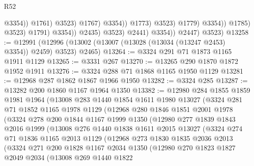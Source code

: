 \begin{lexlean}{R52}
\begin{coremodule}
                                                    @3354))
                                                @1761)
                                              @3523)
                                            @1767)
                                          @3354))
                                      @1773)
                                    @3523)
                                  @1779)
                                @3354))
                            @1785)
                          @3523)
                        @1791)
                      @3354))
                  @2435)
                @3523)
              @2441)
            @3354))
        @2447)
      @3523)
@13258 := @12991 (@12996 (@13002 (@13007 (@13028 (@13034 (@13247 @2453) @3354)) @2459) @3523) @2465)
@13264 := @3324 @291 @71 @1873 @1165 @1911 @1129
@13265 := @3331 @267
@13270 := @13265 @290 @1870 @1872 @1952 @1911
@13276 := @3324 @288 @71 @1868 @1165 @1950 @1129
@13281 := @12968 @287 @1862 @1867 @1966 @1950
@13282 := @3324 @285
@13287 := @13282 @200 @1860 @1167 @1964 @1350
@13382 := @12980
    @284
    @1855
    @1859
    @1981
    @1964
    (@13008
      @283
      @1440
      @1854
      @1611
      @1980
      @13027
      (@3324
        @281
        @71
        @1852
        @1165
        @1978
        @1129
        (@12968
          @280
          @1846
          @1851
          @2001
          @1978
          (@3324
            @278
            @200
            @1844
            @1167
            @1999
            @1350
            (@12980
              @277
              @1839
              @1843
              @2016
              @1999
              (@13008
                @276
                @1440
                @1838
                @1611
                @2015
                @13027
                (@3324
                  @274
                  @71
                  @1836
                  @1165
                  @2013
                  @1129
                  (@12968
                    @273
                    @1830
                    @1835
                    @2036
                    @2013
                    (@3324
                      @271
                      @200
                      @1828
                      @1167
                      @2034
                      @1350
                      (@12980
                        @270
                        @1823
                        @1827
                        @2049
                        @2034
                        (@13008
                          @269
                          @1440
                          @1822

\end{coremodule}
\end{lexlean}
